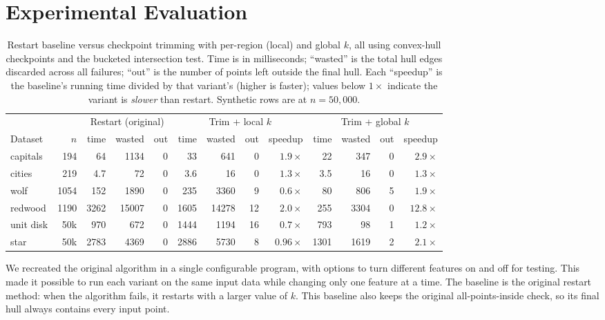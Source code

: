 \documentclass[10pt,twocolumn]{article}
\begin{document}
\section{Experimental Evaluation}
\label{sec:experiments}
\begin{table}[t]
\centering
\caption{Restart baseline versus checkpoint trimming with per-region (local) and
global $k$, all using convex-hull checkpoints and the bucketed intersection test.
Time is in milliseconds; ``wasted'' is the total hull edges discarded across all
failures; ``out'' is the number of points left outside the final hull. Each
``speedup'' is the baseline's running time divided by that variant's (higher is
faster); values below $1\times$ indicate the variant is \emph{slower} than restart.
Synthetic rows are at $n=50{,}000$.}
\label{tab:trim}
\footnotesize
\setlength{\tabcolsep}{9pt}
\begin{tabular}{lr rrr rrrr rrrr}
\toprule
& & \multicolumn{3}{c}{Restart (original)} & \multicolumn{4}{c}{Trim + local $k$} & \multicolumn{4}{c}{Trim + global $k$} \\
\cmidrule(lr){3-5}\cmidrule(lr){6-9}\cmidrule(lr){10-13}
Dataset & $n$ & time & wasted & out & time & wasted & out & speedup & time & wasted & out & speedup \\
\midrule
capitals   & 194  & 64   & 1134  & 0 & 33   & 641   & 0  & $1.9\times$ & 22   & 347  & 0 & $2.9\times$ \\
cities     & 219  & 4.7  & 72    & 0 & 3.6  & 16    & 0  & $1.3\times$ & 3.5  & 16   & 0 & $1.3\times$ \\
wolf       & 1054 & 152  & 1890  & 0 & 235  & 3360  & 9  & $0.6\times$ & 80   & 806  & 5 & $1.9\times$ \\
redwood    & 1190 & 3262 & 15007 & 0 & 1605 & 14278 & 12 & $2.0\times$ & 255  & 3304 & 0 & $12.8\times$ \\
unit disk  & 50k  & 970  & 672   & 0 & 1444 & 1194  & 16 & $0.7\times$ & 793  & 98   & 1 & $1.2\times$ \\
star       & 50k  & 2783 & 4369  & 0 & 2886 & 5730  & 8  & $0.96\times$ & 1301 & 1619 & 2 & $2.1\times$ \\
\bottomrule
\end{tabular}
\end{table}
We recreated the original algorithm in a single configurable program, with options to turn different features on and off for testing. This made it possible to run each variant on the same input data while changing only one feature at a time. The baseline is the original restart method: when the algorithm fails, it restarts with a larger value of $k$. This baseline also keeps the original all-points-inside check, so its final hull always contains every input point.
\end{document}
